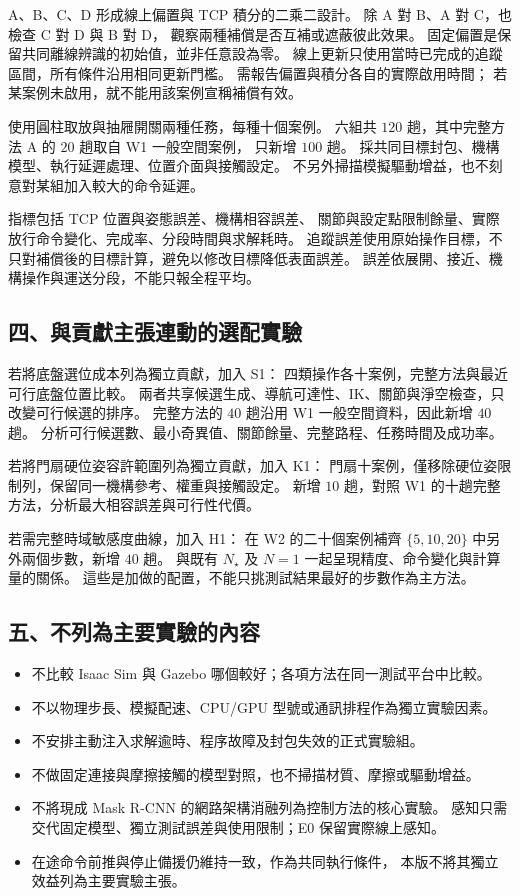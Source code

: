 A、B、C、D 形成線上偏置與 TCP 積分的二乘二設計。
除 A 對 B、A 對 C，也檢查 C 對 D 與 B 對 D，
觀察兩種補償是否互補或遮蔽彼此效果。
固定偏置是保留共同離線辨識的初始值，並非任意設為零。
線上更新只使用當時已完成的追蹤區間，所有條件沿用相同更新門檻。
需報告偏置與積分各自的實際啟用時間；
若某案例未啟用，就不能用該案例宣稱補償有效。

使用圓柱取放與抽屜開關兩種任務，每種十個案例。
六組共 $120$ 趟，其中完整方法 A 的 $20$ 趟取自 W1 一般空間案例，
只新增 $100$ 趟。
採共同目標封包、機構模型、執行延遲處理、位置介面與接觸設定。
不另外掃描模擬驅動增益，也不刻意對某組加入較大的命令延遲。

指標包括 TCP 位置與姿態誤差、機構相容誤差、
關節與設定點限制餘量、實際放行命令變化、完成率、分段時間與求解耗時。
追蹤誤差使用原始操作目標，不只對補償後的目標計算，避免以修改目標降低表面誤差。
誤差依展開、接近、機構操作與運送分段，不能只報全程平均。

\subsection*{四、與貢獻主張連動的選配實驗}

若將底盤選位成本列為獨立貢獻，加入 S1：
四類操作各十案例，完整方法與最近可行底盤位置比較。
兩者共享候選生成、導航可達性、IK、關節與淨空檢查，只改變可行候選的排序。
完整方法的 $40$ 趟沿用 W1 一般空間資料，因此新增 $40$ 趟。
分析可行候選數、最小奇異值、關節餘量、完整路程、任務時間及成功率。

若將門扇硬位姿容許範圍列為獨立貢獻，加入 K1：
門扇十案例，僅移除硬位姿限制列，保留同一機構參考、權重與接觸設定。
新增 $10$ 趟，對照 W1 的十趟完整方法，分析最大相容誤差與可行性代價。

若需完整時域敏感度曲線，加入 H1：
在 W2 的二十個案例補齊 $\{5,10,20\}$ 中另外兩個步數，新增 $40$ 趟。
與既有 $N_\star$ 及 $N=1$ 一起呈現精度、命令變化與計算量的關係。
這些是加做的配置，不能只挑測試結果最好的步數作為主方法。

\subsection*{五、不列為主要實驗的內容}

\begin{itemize}
    \item 不比較 Isaac Sim 與 Gazebo 哪個較好；各項方法在同一測試平台中比較。
    \item 不以物理步長、模擬配速、CPU/GPU 型號或通訊排程作為獨立實驗因素。
    \item 不安排主動注入求解逾時、程序故障及封包失效的正式實驗組。
    \item 不做固定連接與摩擦接觸的模型對照，也不掃描材質、摩擦或驅動增益。
    \item 不將現成 Mask R-CNN 的網路架構消融列為控制方法的核心實驗。
    感知只需交代固定模型、獨立測試誤差與使用限制；E0 保留實際線上感知。
    \item 在途命令前推與停止備援仍維持一致，作為共同執行條件，
    本版不將其獨立效益列為主要實驗主張。
\end{itemize}

